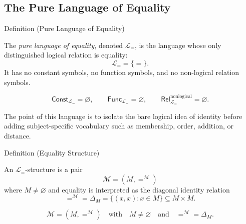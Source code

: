 
\subsection{The Pure Language of Equality}

\begin{definitionbox}{Definition (Pure Language of Equality)}
\begin{definition}\label{def:axiomatic-equality-language}
The \emph{pure language of equality}, denoted \(\mathcal L_{=}\), is the
language whose only distinguished logical relation is equality:
\[
  \mathcal L_{=}=\{=\}.
\]
It has no constant symbols, no function symbols, and no non-logical relation
symbols.
\end{definition}
\end{definitionbox}

\begin{remark*}
\[
  \mathsf{Const}_{\mathcal L_=}=\varnothing,\qquad
  \mathsf{Func}_{\mathcal L_=}=\varnothing,\qquad
  \mathsf{Rel}_{\mathcal L_=}^{\mathrm{nonlogical}}=\varnothing.
\]
\end{remark*}

\begin{remark*}[Interpretation]
The point of this language is to isolate the bare logical idea of identity
before adding subject-specific vocabulary such as membership, order, addition,
or distance.
\end{remark*}

\DefinitionalRoot

\begin{definitionbox}{Definition (Equality Structure)}
\begin{definition}\label{def:axiomatic-equality-structure}
An \(\mathcal L_{=}\)-structure is a pair
\[
  \mathcal M=(M,=^{\mathcal M})
\]
where \(M\neq\varnothing\) and equality is interpreted as the diagonal identity
relation
\[
  =^{\mathcal M}=\Delta_M
  =\{(x,x):x\in M\}\subseteq M\times M.
\]
\end{definition}
\end{definitionbox}

\begin{remark*}
\[
  \mathcal M=(M,=^{\mathcal M})
  \quad\text{with}\quad
  M\neq\varnothing
  \quad\text{and}\quad
  =^{\mathcal M}=\Delta_M.
\]
\end{remark*}

